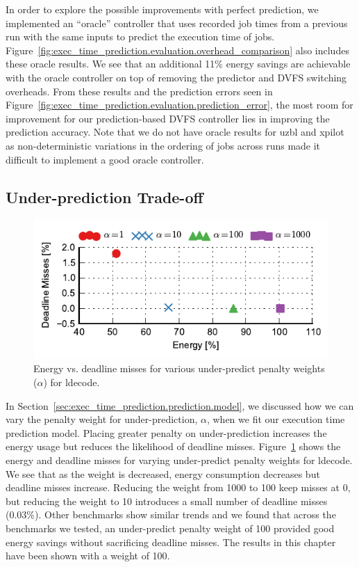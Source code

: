 In order to explore the possible improvements with perfect prediction, we
implemented an ``oracle'' controller that uses recorded job times from a
previous run with the same inputs to predict the execution time of jobs.
Figure~\ref{fig:exec_time_prediction.evaluation.overhead_comparison} also
includes these oracle results. We see that an additional 11\% energy savings
are achievable with the oracle controller on top of removing the predictor and
DVFS switching overheads. From these results and the prediction errors seen in
Figure~\ref{fig:exec_time_prediction.evaluation.prediction_error}, the most
room for improvement for our prediction-based DVFS controller lies in improving
the prediction accuracy. Note that we do not have oracle results for uzbl and
xpilot as
non-deterministic variations in the ordering of jobs across runs made it
difficult to implement a good oracle controller.

\subsection{Under-prediction Trade-off}

\begin{figure}
  \begin{center}
    \includegraphics{exec_time_prediction/data/underpredict_sweep.pdf}
    \caption{Energy vs. deadline misses for various under-predict penalty
    weights ($\alpha$) for ldecode.}
    \label{fig:exec_time_prediction.evaluation.underpredict_sweep}
  \end{center}
\end{figure}

In Section~\ref{sec:exec_time_prediction.prediction.model}, we discussed how we
can vary the penalty weight for under-prediction, $\alpha$, when we fit our
execution time prediction model. Placing greater penalty on under-prediction
increases the energy usage but reduces the likelihood of deadline misses.
Figure~\ref{fig:exec_time_prediction.evaluation.underpredict_sweep} shows the
energy and deadline misses for varying under-predict penalty weights for
ldecode. We see that as the weight is decreased, energy consumption decreases
but deadline misses increase. Reducing the weight from 1000 to 100 keep misses
at 0, but reducing the weight to 10 introduces a small number of deadline
misses (0.03\%). Other benchmarks show similar trends and we found that across
the benchmarks we tested, an under-predict penalty weight of 100 provided good
energy savings without sacrificing deadline misses. The results in this chapter
have been shown with a weight of 100.

